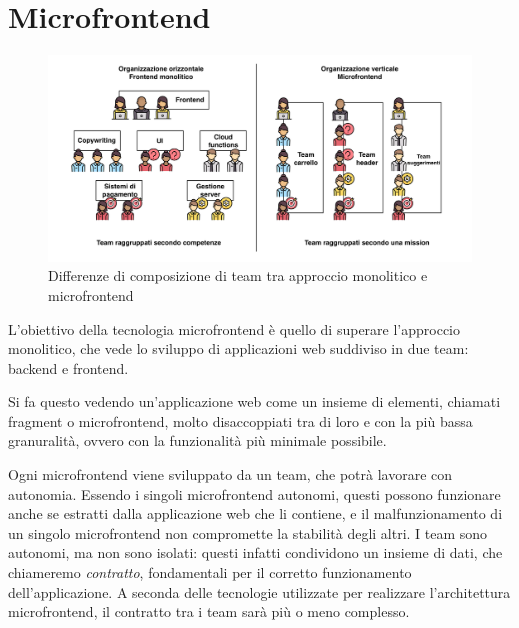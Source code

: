 \chapter{Microfrontend}\label{ch:chapter1}
\begin{figure}[H]
  \centering
  \includegraphics[width=160mm]{img/schema_microfrontend}
  \caption{Differenze di composizione di team tra approccio monolitico e microfrontend}
\end{figure}
L'obiettivo della tecnologia microfrontend è quello di superare l'approccio monolitico, che vede
lo sviluppo di applicazioni web suddiviso in due team: backend e frontend.

Si fa questo vedendo un'applicazione web come un insieme
di elementi, chiamati fragment o microfrontend, molto disaccoppiati tra di loro
e con la più bassa granuralità, ovvero con la funzionalità più minimale possibile.

Ogni microfrontend viene sviluppato da un team, che potrà lavorare con autonomia. 
Essendo i singoli microfrontend autonomi,
questi possono funzionare anche se estratti dalla applicazione web che li contiene,
 e il malfunzionamento di un singolo microfrontend
non compromette la stabilità degli altri.
I team sono autonomi, ma non sono isolati: questi infatti condividono un insieme di dati, che
chiameremo \emph{contratto},
fondamentali per il corretto funzionamento dell'applicazione. A seconda delle tecnologie utilizzate
per realizzare l'architettura microfrontend, il contratto tra i team sarà più o meno complesso.



